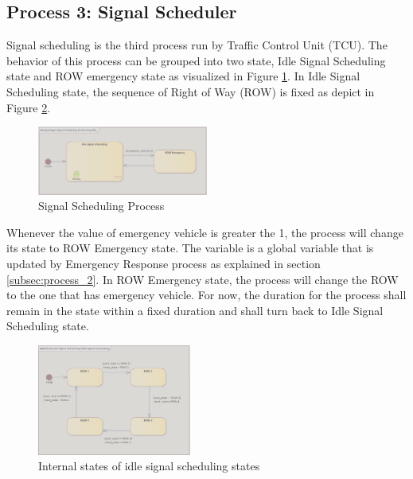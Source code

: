 \subsection{Process 3: Signal Scheduler }
\label{subsec:process_3} 

Signal scheduling is the third process run by Traffic Control Unit (TCU).  The behavior of this process can be grouped into two state, Idle Signal Scheduling state and ROW emergency state as visualized in Figure \ref{img:process_3_state_machine}. In Idle Signal Scheduling state, the sequence of Right of Way (ROW) is fixed as depict in Figure \ref{img:process_3_internal_state_machine}. 

\begin{figure}[ht]
    \centering
    \includegraphics[width=0.5\textwidth]{images/process_3_state_machine.png}
    \caption{Signal Scheduling Process }
    \label{img:process_3_state_machine}
\end{figure}


Whenever the value of emergency vehicle is greater the 1, the process will change its state to ROW Emergency state. The variable is a global variable that is updated by Emergency Response process as explained in section \ref{subsec:process_2}. In ROW Emergency state, the process will change the ROW to the one that has emergency vehicle. For now, the duration for the process shall remain in the state within a fixed duration and shall turn back to Idle Signal Scheduling state.

\begin{figure}[ht]
    \centering
    \includegraphics[width=0.45\textwidth]{images/process_3_internal_state_machine.png}
    \caption{Internal states of idle signal scheduling states}
    \label{img:process_3_internal_state_machine}
\end{figure}

